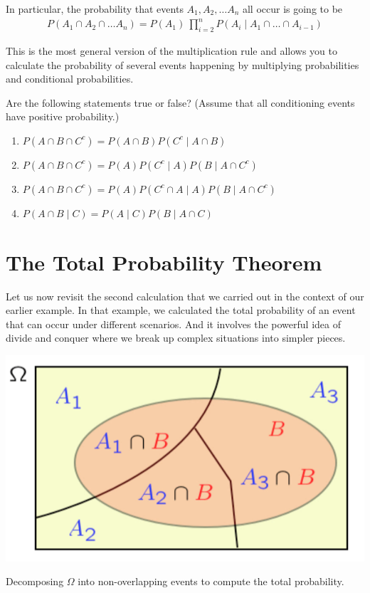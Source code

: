 \documentclass{tufte-handout}
\begin{document}
In particular, the probability that events $A_1, A_2, \ldots A_n$ all occur is going to be 
\begin{align*}
P(A_1 \cap A_2 \cap \ldots A_n) = P(A_1) \ \prod_{i = 2}^n P (A_i \mid A_1 \cap \ldots \cap A_{i-1})
\end{align*}


This is the most general version of the multiplication rule and allows you to calculate the probability
of several events happening by multiplying probabilities and conditional probabilities.



 Are the following statements true or false? 
(Assume that all conditioning events have positive probability.)
\begin{enumerate}
\item $P(A \cap B \cap C^c) = P(A \cap B) P(C^c \mid A \cap B)$
\item $P(A \cap B \cap C^c) = P(A) P( C^c \mid A) P( B \mid A \cap C^c)$
\item $P(A \cap B \cap C^c) = P(A) P( C^c \cap A \mid A) P( B \mid A \cap C^c)$
\item $P(A \cap B \mid C) = P( A \mid C) P( B \mid A \cap C)$
\end{enumerate}




\vspace{0.4cm}
\section{The Total Probability Theorem}\label{sec:TotalProb}



Let us now revisit the second calculation that we carried out in the context of our earlier example. In
that example, we calculated the total probability of an event that can occur under different scenarios.
And it involves the powerful idea of divide and conquer where we break up complex situations into
simpler pieces.

\begin{marginfigure}
  \includegraphics{TotalProb}
  \caption{Decomposing $\Omega$ into non-overlapping events to compute the total probability.}
\end{marginfigure}
\end{document}
